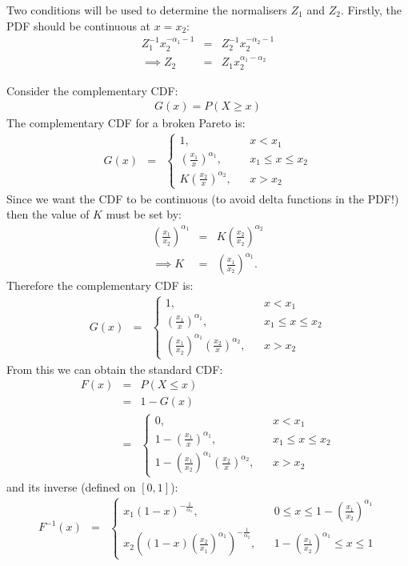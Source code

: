 \documentclass[letterpaper, 11pt]{article}
\begin{document}
Two conditions will be used to determine the normalisers $Z_1$ and $Z_2$.
Firstly, the PDF should be continuous at $x=x_2$:
\begin{eqnarray}
Z_1^{-1}x_2^{-\alpha_1 - 1} &=& Z_2^{-1}x_2^{-\alpha_2 - 1}\\
\implies
Z_2 &=& Z_1x_2^{\alpha_1-\alpha_2}
\end{eqnarray}


Consider the complementary CDF:
\begin{eqnarray}
G(x) = P(X \geq x)
\end{eqnarray}
The complementary CDF for a broken Pareto is:
\begin{eqnarray}
G(x) &=&
\left\{
\begin{array}{lcr}
1, & & x < x_1 \\
\left(\frac{x_1}{x}\right)^{\alpha_1}, & & x_1 \leq x \leq x_2 \\
K\left(\frac{x_2}{x}\right)^{\alpha_2}, & & x > x_2
\end{array}
\right.
\end{eqnarray}
Since we want the CDF to be continuous (to avoid delta functions in the PDF!)
then the value of $K$ must be set by:
\begin{eqnarray}
\left(\frac{x_1}{x_2}\right)^{\alpha_1} &=& K\left(\frac{x_2}{x_2}\right)^{\alpha_2} \\
\implies K &=& \left(\frac{x_1}{x_2}\right)^{\alpha_1}.
\end{eqnarray}
Therefore the complementary CDF is:
\begin{eqnarray}
G(x) &=&
\left\{
\begin{array}{lcr}
1, & & x < x_1 \\
\left(\frac{x_1}{x}\right)^{\alpha_1}, & & x_1 \leq x \leq x_2 \\
\left(\frac{x_1}{x_2}\right)^{\alpha_1}\left(\frac{x_2}{x}\right)^{\alpha_2}, & & x > x_2
\end{array}
\right.
\end{eqnarray}
From this we can obtain the standard CDF:
\begin{eqnarray}
F(x) &=& P(X \leq x) \\
&=& 1 - G(x)\\
&=& \left\{
\begin{array}{lcr}
0, & & x < x_1 \\
1 - \left(\frac{x_1}{x}\right)^{\alpha_1}, & & x_1 \leq x \leq x_2 \\
1 - \left(\frac{x_1}{x_2}\right)^{\alpha_1}\left(\frac{x_2}{x}\right)^{\alpha_2}, & & x > x_2
\end{array}
\right.
\end{eqnarray}
and its inverse (defined on $[0, 1]$):
\begin{eqnarray}
F^{-1}(x) 
&=& \left\{
\begin{array}{lcr}
x_1(1-x)^{-\frac{1}{\alpha_1}}, & & 0 \leq x \leq 1 - \left(\frac{x_1}{x_2}\right)^{\alpha_1} \\
x_2\left((1-x)\left(\frac{x_2}{x_1}\right)^{\alpha_1}\right)^{-\frac{1}{\alpha_2}}, & & 1 - \left(\frac{x_1}{x_2}\right)^{\alpha_1} \leq x \leq 1
\end{array}
\right.
\end{eqnarray}
\end{document}
